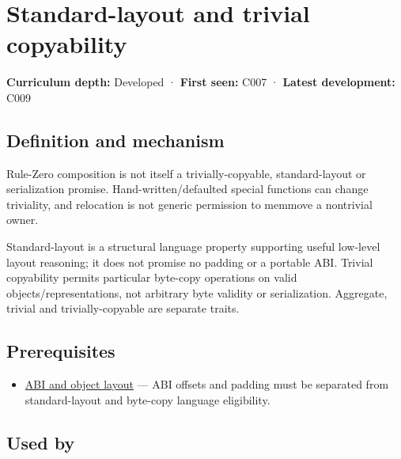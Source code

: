 \hypertarget{appendix-958870a64c53}{}\label{referencestart:appendix-958870a64c53}
\section{Standard-layout and trivial copyability}\label{appendix-958870a64c53-standard-layout-and-trivial-copyability}

\textbf{Curriculum depth:} Developed · \textbf{First seen:} C007 · \textbf{Latest development:} C009

\begin{allmightroledefinition}

\subsection{Definition and mechanism}\label{appendix-958870a64c53-definition-and-mechanism}

Rule-Zero composition is not itself a trivially-copyable, standard-layout or serialization promise. Hand-written/defaulted special functions can change triviality, and relocation is not generic permission to memmove a nontrivial owner.

\end{allmightroledefinition}

Standard-layout is a structural language property supporting useful low-level layout reasoning; it does not promise no padding or a portable ABI. Trivial copyability permits particular byte-copy operations on valid objects/representations, not arbitrary byte validity or serialization. Aggregate, trivial and trivially-copyable are separate traits.

\subsection{Prerequisites}\label{appendix-958870a64c53-prerequisites}

\begin{itemize}
\tightlist
\item
  \hyperref[appendix-c4ac6bb0fff8]{ABI and object layout} --- ABI offsets and padding must be separated from standard-layout and byte-copy language eligibility.
\end{itemize}

\subsection{Used by}\label{appendix-958870a64c53-used-by}

